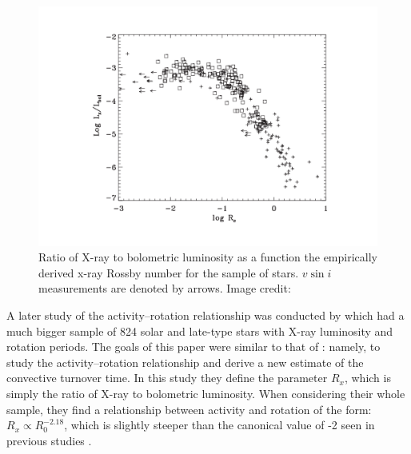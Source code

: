 \begin{figure}
    \centering
    \includegraphics[scale=0.55]{Figures/2-Historical_overview/p03_fig_9.pdf}
    \caption[Activity--rotation relationship from \citet{Pizzolato_etal_2003}]{Ratio of X-ray to bolometric luminosity as a function the empirically derived x-ray Rossby number for the \citet{Pizzolato_etal_2003} sample of stars. $v\sin i$ measurements are denoted by arrows. Image credit: \citet{Pizzolato_etal_2003}}
    \label{fig:pizzolato_etal_2003_plot}
\end{figure}

A later study of the activity--rotation relationship was conducted by \citet{Wright_etal_2011} which had a much bigger sample of 824 solar and late-type stars with X-ray luminosity and rotation periods. The goals of this paper were similar to that of \citet{Pizzolato_etal_2003}: namely, to study the activity--rotation relationship and derive a new estimate of the convective turnover time. In this study they define the parameter $R_{x}$, which is simply the ratio of X-ray to bolometric luminosity. When considering their whole sample, they find a relationship between activity and rotation of the form: $R_{x} \propto R_{0}^{-2.18}$, which is slightly steeper than the canonical value of -2 seen in previous studies \citep{Pallavicini_etal_1981,Pizzolato_etal_2003}.

